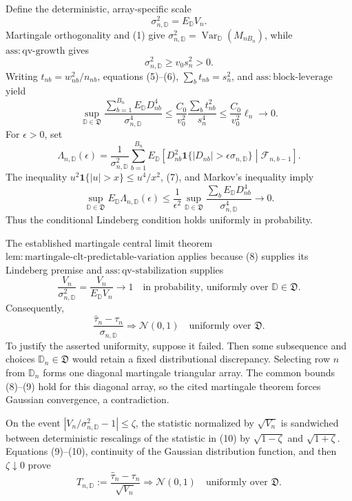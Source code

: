 Define the deterministic, array-specific scale
\[
\sigma_{n,\mathbb D}^2=E_{\mathbb D}V_n.
\]
Martingale orthogonality and (1) give
\(\sigma_{n,\mathbb D}^2=\operatorname{Var}_{\mathbb D}(M_{nB_n})\), while \(\mathrm{ass:qv\text{-}growth}\) gives
\[
\sigma_{n,\mathbb D}^2\ge v_0s_n^2>0.
\tag{6}
\]
Writing \(t_{nb}=w_{nb}^2/n_{nb}\), equations (5)--(6), \(\sum_bt_{nb}=s_n^2\), and \(\mathrm{ass:block\text{-}leverage}\) yield
\[
\sup_{\mathbb D\in\mathfrak D}
\frac{\sum_{b=1}^{B_n}E_{\mathbb D}D_{nb}^4}{\sigma_{n,\mathbb D}^4}
\le\frac{C_0}{v_0^2}\frac{\sum_bt_{nb}^2}{s_n^4}
\le\frac{C_0}{v_0^2}\ell_n\longrightarrow0.
\tag{7}
\]
For \(\epsilon>0\), set
\[
\Lambda_{n,\mathbb D}(\epsilon)
=\frac1{\sigma_{n,\mathbb D}^2}\sum_{b=1}^{B_n}
E_{\mathbb D}\left[D_{nb}^2\mathbf1\{|D_{nb}|>\epsilon\sigma_{n,\mathbb D}\}
\middle|\mathcal F_{n,b-1}\right].
\]
The inequality \(u^2\mathbf1\{|u|>x\}\le u^4/x^2\), (7), and Markov's inequality imply
\[
\sup_{\mathbb D\in\mathfrak D}E_{\mathbb D}\Lambda_{n,\mathbb D}(\epsilon)
\le\frac1{\epsilon^2}
\sup_{\mathbb D\in\mathfrak D}
\frac{\sum_bE_{\mathbb D}D_{nb}^4}{\sigma_{n,\mathbb D}^4}
\longrightarrow0.
\tag{8}
\]
Thus the conditional Lindeberg condition holds uniformly in probability.

The established martingale central limit theorem
\(\mathrm{lem:martingale\text{-}clt\text{-}predictable\text{-}variation}\) applies because (8) supplies its Lindeberg premise and \(\mathrm{ass:qv\text{-}stabilization}\) supplies
\[
\frac{V_n}{\sigma_{n,\mathbb D}^2}
=\frac{V_n}{E_{\mathbb D}V_n}\longrightarrow1
\quad\text{in probability, uniformly over }\mathbb D\in\mathfrak D.
\tag{9}
\]
Consequently,
\[
\frac{\widehat\tau_n-\tau_n}{\sigma_{n,\mathbb D}}
\Rightarrow\mathcal N(0,1)
\quad\text{uniformly over }\mathfrak D.
\tag{10}
\]
To justify the asserted uniformity, suppose it failed. Then some subsequence and choices \(\mathbb D_n\in\mathfrak D\) would retain a fixed distributional discrepancy. Selecting row \(n\) from \(\mathbb D_n\) forms one diagonal martingale triangular array. The common bounds (8)--(9) hold for this diagonal array, so the cited martingale theorem forces Gaussian convergence, a contradiction.

On the event \(|V_n/\sigma_{n,\mathbb D}^2-1|\le\zeta\), the statistic normalized by \(\sqrt{V_n}\) is sandwiched between deterministic rescalings of the statistic in (10) by \(\sqrt{1-\zeta}\) and \(\sqrt{1+\zeta}\). Equations (9)--(10), continuity of the Gaussian distribution function, and then \(\zeta\downarrow0\) prove
\[
T_{n,\mathbb D}:=\frac{\widehat\tau_n-\tau_n}{\sqrt{V_n}}
\Rightarrow\mathcal N(0,1)
\quad\text{uniformly over }\mathfrak D.
\tag{11}
\]

